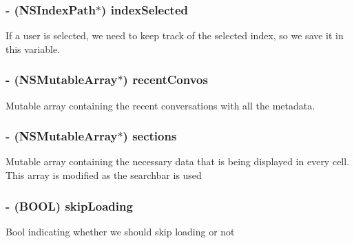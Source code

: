 \subsubsection[{index\+Selected}]{\setlength{\rightskip}{0pt plus 5cm}-\/ (N\+S\+Index\+Path$\ast$) index\+Selected\hspace{0.3cm}{\ttfamily [protected]}}\label{category_e_s_people_view_07_08_ac4b9d7c2158586b80c913ed69fd1611f}
If a user is selected, we need to keep track of the selected index, so we save it in this variable. \hypertarget{category_e_s_people_view_07_08_aa55fcf186ea10b60bac943aa266223aa}{}
\subsubsection[{recent\+Convos}]{\setlength{\rightskip}{0pt plus 5cm}-\/ (N\+S\+Mutable\+Array$\ast$) recent\+Convos\hspace{0.3cm}{\ttfamily [protected]}}\label{category_e_s_people_view_07_08_aa55fcf186ea10b60bac943aa266223aa}
Mutable array containing the recent conversations with all the metadata. \hypertarget{category_e_s_people_view_07_08_a96904bde3b0f3fab287cf97a8c9364b1}{}
\subsubsection[{sections}]{\setlength{\rightskip}{0pt plus 5cm}-\/ (N\+S\+Mutable\+Array$\ast$) sections\hspace{0.3cm}{\ttfamily [protected]}}\label{category_e_s_people_view_07_08_a96904bde3b0f3fab287cf97a8c9364b1}
Mutable array containing the necessary data that is being displayed in every cell. This array is modified as the searchbar is used \hypertarget{category_e_s_people_view_07_08_a6ead33d3897e8f5150cbbc90ef419211}{}
\subsubsection[{skip\+Loading}]{\setlength{\rightskip}{0pt plus 5cm}-\/ (B\+O\+O\+L) skip\+Loading\hspace{0.3cm}{\ttfamily [protected]}}\label{category_e_s_people_view_07_08_a6ead33d3897e8f5150cbbc90ef419211}
Bool indicating whether we should skip loading or not \hypertarget{category_e_s_people_view_07_08_a612fdb0ea8b8e860f7ff21ba8352388c}{}
